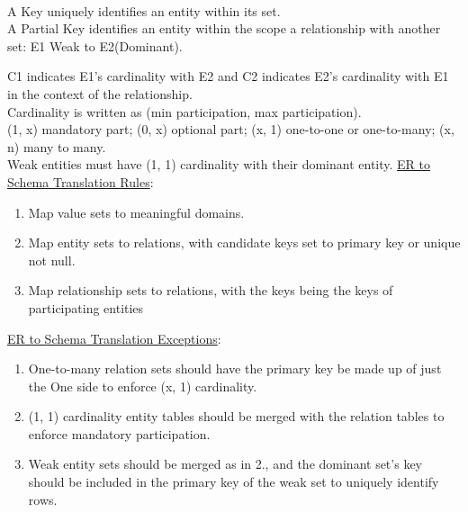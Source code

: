 \begin{multicols*}{3}
\\A Key uniquely identifies an entity within its set.\\
A Partial Key identifies an entity within the scope a relationship with another set: E1 Weak to E2(Dominant).\\
C1 indicates E1's cardinality with E2 and C2 indicates E2's cardinality with E1 in the context of the relationship.\\
Cardinality is written as (min participation, max participation).\\
(1, x) mandatory part; (0, x) optional part; (x, 1) one-to-one or one-to-many; (x, n) many to many.\\
Weak entities must have (1, 1) cardinality with their dominant entity.
\underline{ER to Schema Translation Rules}:
\begin{enumerate}[leftmargin=*]
    \item Map value sets to meaningful domains.
    \item Map entity sets to relations, with candidate keys set to primary key or unique not null.
    \item Map relationship sets to relations, with the keys being the keys of participating entities
\end{enumerate}
\underline{ER to Schema Translation Exceptions}:
\begin{enumerate}[leftmargin=*]
    \item One-to-many relation sets should have the primary key be made up of  just the One side to enforce (x, 1) cardinality.
    \item  (1, 1) cardinality entity tables should be merged with the relation tables to enforce mandatory participation.
    \item Weak entity sets should be merged as in 2., and the dominant set's key should be included in the primary key of the weak set to uniquely identify rows.\\
\end{enumerate}


\end{multicols*}
